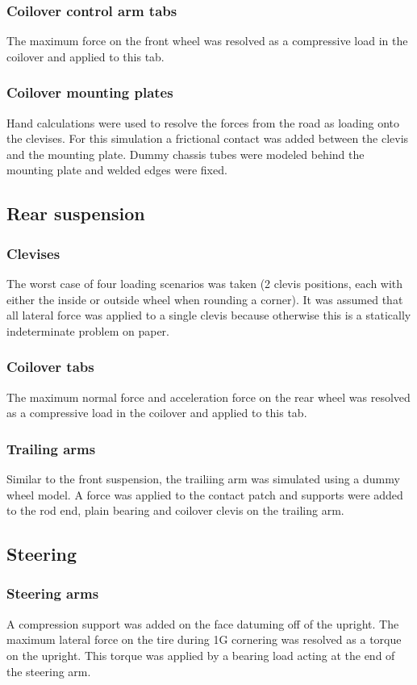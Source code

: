 \documentclass[10pt]{article}
\begin{document}
\subsubsection{Coilover control arm tabs}
The maximum force on the front wheel was resolved as a compressive load in the coilover and applied to this tab.

\subsubsection{Coilover mounting plates}
Hand calculations were used to resolve the forces from the road as loading onto the clevises. For this simulation a frictional contact was added between the clevis and the mounting plate. Dummy chassis tubes were modeled behind the mounting plate and welded edges were fixed.

\subsection{Rear suspension}
\subsubsection{Clevises}
The worst case of four loading scenarios was taken (2 clevis positions, each with either the inside or outside wheel when rounding a corner). It was assumed that all lateral force was applied to a single clevis because otherwise this is a statically indeterminate problem on paper.

\subsubsection{Coilover tabs}
The maximum normal force and acceleration force on the rear wheel was resolved as a compressive load in the coilover and applied to this tab.

\subsubsection{Trailing arms}
Similar to the front suspension, the trailiing arm was simulated using a dummy wheel model. A force was applied to the contact patch and supports were added to the rod end, plain bearing and coilover clevis on the trailing arm.

\subsection{Steering}
\subsubsection{Steering arms}
A compression support was added on the face datuming off of the upright. The maximum lateral force on the tire during 1G cornering was resolved as a torque on the upright. This torque was applied by a bearing load acting at the end of the steering arm.
\end{document}
